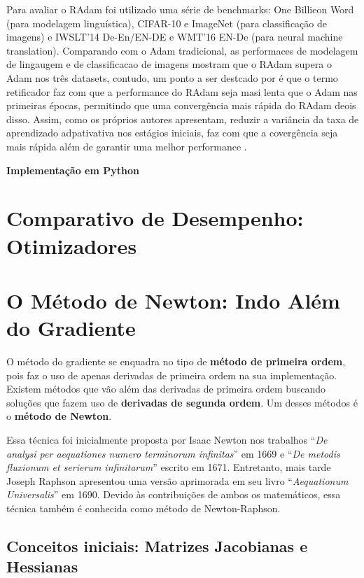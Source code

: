 Para avaliar o RAdam foi utilizado uma série de benchmarks: One Billieon Word (para modelagem linguística), CIFAR-10 e ImageNet (para classificação de imagens) e IWSLT’14 De-En/EN-DE e WMT’16 EN-De  (para neural machine translation). Comparando com o Adam tradicional, as performaces de modelagem de lingaugem e de classificacao de imagens mostram que o RAdam supera o Adam nos três datasets, contudo, um ponto a ser destcado por \textcite{RAdamMethod} é que o termo retificador faz com que a performance do RAdam seja masi lenta que o Adam nas primeiras épocas, permitindo que uma convergência mais rápida do RAdam deois disso. Assim, como os próprios autores apresentam, reduzir a variância da taxa de aprendizado adpativativa nos estágios iniciais, faz com que a covergência seja mais rápida além de garantir uma melhor performance \parencite{RAdamMethod}.

\textbf{Implementação em Python}

\section{Comparativo de Desempenho: Otimizadores}


\section{O Método de Newton: Indo Além do Gradiente}

O método do gradiente se enquadra no tipo de \textbf{método de primeira ordem}, pois faz o uso de apenas derivadas de primeira ordem na sua implementação. Existem métodos que vão além das derivadas de primeira ordem buscando soluções que fazem uso de \textbf{derivadas de segunda ordem}. Um desses métodos é o \textbf{método de Newton}.

Essa técnica foi inicialmente proposta por Isaac Newton nos trabalhos “\textit{De analysi per aequationes numero terminorum infinitas}” em 1669 e “\textit{De metodis fluxionum et serierum infinitarum}” escrito em 1671. Entretanto, mais tarde Joseph Raphson apresentou uma versão aprimorada em seu livro “\textit{Aequationum Universalis}” em 1690. Devido às contribuições de ambos os matemáticos, essa técnica também é conhecida como método de Newton-Raphson.

\subsection{Conceitos iniciais: Matrizes Jacobianas e Hessianas}

